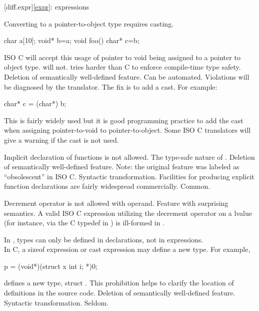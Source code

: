 [diff.expr]{\ref{expr}: expressions}

\change
Converting  to a pointer-to-object type requires casting.

\begin{codeblock}
char a[10];
void* b=a;
void foo() {
  char* c=b;
}
\end{codeblock}

ISO C will accept this usage of pointer to void being assigned
to a pointer to object type.
\Cpp{} will not.
\rationale
\Cpp{} tries harder than C to enforce compile-time type safety.
\effect
Deletion of semantically well-defined feature.
\difficulty
Can be automated.
Violations will be diagnosed by the \Cpp{} translator.
The
fix is to add a  cast.
For example:
\begin{codeblock}
char* c = (char*) b;
\end{codeblock}

\howwide
This is fairly widely used but it is good
programming practice to add the cast when assigning pointer-to-void to pointer-to-object.
Some ISO C translators will give a warning
if the cast is not used.

\change
Implicit declaration of functions is not allowed.
\rationale
The type-safe nature of \Cpp{}.
\effect
Deletion of semantically well-defined feature.
Note: the original feature was labeled as ``obsolescent'' in ISO C.
\difficulty
Syntactic transformation.
Facilities for producing explicit function declarations are fairly
widespread commercially.
\howwide
Common.

\change
Decrement operator is not allowed with  operand.
\rationale
Feature with surprising semantics.
\effect
A valid ISO C expression utilizing the decrement operator on
a  lvalue
(for instance, via the C typedef in )
is ill-formed in \Cpp{}.

\change
In \Cpp{}, types can only be defined in declarations, not in expressions.\\
In C, a sizeof expression or cast expression may define a new type.
For example,
\begin{codeblock}
p = (void*)(struct x {int i;} *)0;
\end{codeblock}
defines a new type, struct .
\rationale
This prohibition helps to clarify the location of
definitions in the source code.
\effect
Deletion of semantically well-defined feature.
\difficulty
Syntactic transformation.
\howwide
Seldom.

